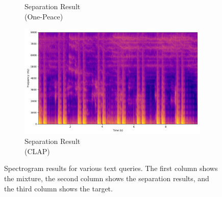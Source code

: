 \begin{figure}[htbp]
\begin{subfigure}[b]{0.22\textwidth}
        \caption*{Separation Result\\(One-Peace)}
    \end{subfigure}
    \begin{subfigure}[b]{0.22\textwidth}
        \centering
        \includegraphics[width=\textwidth]{plots/onepeace_best_sdr/clap sep_spectrogram.png}
        \caption*{Separation Result\\(CLAP)}
    \end{subfigure}


    \caption{Spectrogram results for various text queries. The first column shows the mixture, the second column shows the separation results, and the third column shows the target.}
    
    \label{fig:separation_results}

\end{figure}
